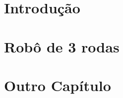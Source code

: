 





\frenchspacing 


	

\textual

	\chapter{Introdução}
	

	

	\chapter{Robô de 3 rodas}
	

	\chapter{Outro Capítulo}
	




	


	

\postextual

	

	

	

	



\printindex


